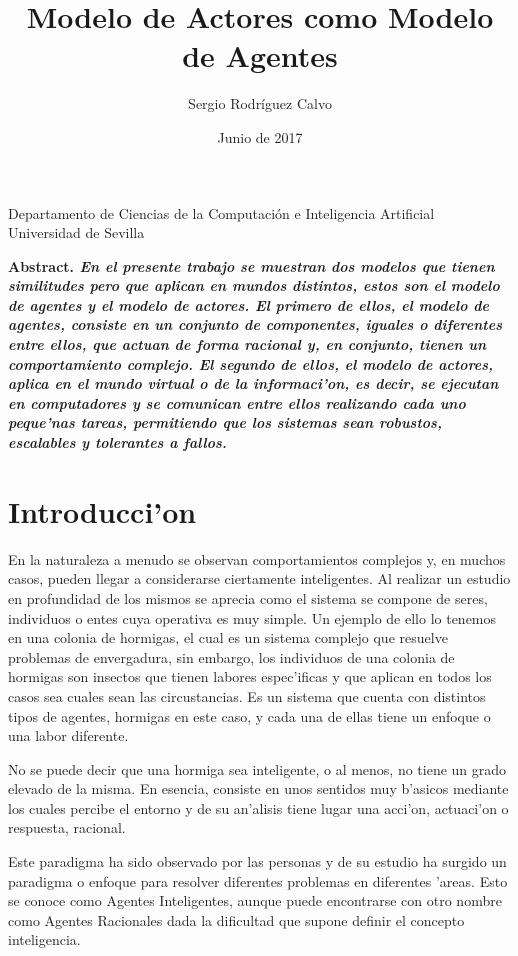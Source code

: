 \documentclass[12pt]{article}
\title{Modelo de Actores como Modelo de Agentes}
\author{Sergio Rodr\'iguez Calvo}
\date{Junio de 2017}
\begin{document}
    \maketitle
    \thispagestyle{empty}
    \begin{center}
      Departamento de Ciencias de la Computaci\'on e
      Inteligencia Artificial \\
      Universidad de Sevilla
      \end{center}
  \bf{Abstract. }\rm
    \emph{En el presente trabajo se muestran dos modelos que tienen similitudes
    pero que aplican en mundos distintos, estos son el modelo de agentes y
    el modelo de actores. El primero de ellos, el modelo de agentes, consiste en
    un conjunto de componentes, iguales o diferentes entre ellos, que actuan de forma
    racional y, en conjunto, tienen un comportamiento complejo. El segundo de ellos,
    el modelo de actores, aplica en el mundo virtual o de la informaci'on, es decir,
    se ejecutan en computadores y se comunican entre ellos realizando cada uno peque'nas tareas,
    permitiendo que los sistemas sean robustos, escalables y tolerantes a fallos.}
\section{Introducci'on}
En la naturaleza a menudo se observan comportamientos complejos y, en muchos casos,
pueden llegar a considerarse ciertamente inteligentes. Al realizar un estudio en profundidad
de los mismos se aprecia como el sistema se compone de seres, individuos o entes cuya operativa
es muy simple. Un ejemplo de ello lo tenemos en una colonia de hormigas, el cual es un
sistema complejo que resuelve problemas de envergadura, sin embargo, los individuos de
una colonia de hormigas son insectos que tienen labores espec'ificas y que aplican en
todos los casos sea cuales sean las circustancias. Es un sistema que cuenta con distintos
tipos de agentes, hormigas en este caso, y cada una de ellas tiene un enfoque o una labor diferente.

No se puede decir que una hormiga sea inteligente, o al menos, no tiene un grado elevado de la misma.
En esencia, consiste en unos sentidos muy b'asicos mediante los cuales percibe el entorno y
de su an'alisis tiene lugar una acci'on, actuaci'on o respuesta, racional.

Este paradigma ha sido observado por las personas y de su estudio ha surgido un paradigma o
enfoque para resolver diferentes problemas en diferentes 'areas. Esto se conoce como Agentes
Inteligentes, aunque puede encontrarse con otro nombre como Agentes Racionales dada la dificultad
que supone definir el concepto inteligencia.
\end{document}
